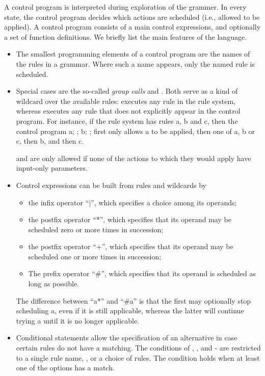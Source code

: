 A control program is interpreted during exploration of the grammer. In every
state, the control program decides which actions are scheduled (i.e., allowed
to be applied). A control program consists of a main control expressions, and
optionally a set of function definitions. We briefly list the main features of
the language.
%
\begin{itemize}
\item The smallest programming elements of a control program are the names of
  the rules in a grammar. Where such a name appears, only the named rule is scheduled.

\item Special cases are the so-called \emph{group calls} \anyK{} and
  \otherK. Both serve as a kind of wildcard over the available rules: \anyK{}
  executes any rule in the rule system, whereas \otherK{} executes any rule
  that does not explicitly appear in the control program. For instance, if the
  rule system has rules \textsf{a}, \textsf{b} and \textsf{c}, then the
  control program \textsf{a; \anyK; b; \otherK;} first only allows \textsf{a}
  to be applied, then one of \textsf{a}, \textsf{b} or \textsf{c}, then
  \textsf{b}, and then \textsf{c}.

  \anyK and \otherK are only allowed if none of the actions to which they
  would apply have input-only parameters.

\item Control expressions can be built from rules and wildcards by 
\begin{itemize}\noitemsep
\item the infix operator ``\textsf{$|$}'', which specifies a choice among its
  operands;
\item the postfix operator ``\textsf{*}'', which specifies that its operand may
  be scheduled zero or more times in succession;
\item the postfix operator ``\textsf{+}'', which specifies that its operand may
  be scheduled one or more times in succession;
\item The prefix operator ``\textsf{\#}'', which specifies that its operand is
  scheduled as long as possible. 
\end{itemize}
The difference between ``\textsf{a*}'' and ``\textsf{\#a}'' is that the first
may optionally stop scheduling \textsf{a}, even if it is still applicable,
whereas the latter will continue trying \textsf{a} until it is no longer applicable.

\item Conditional statements allow the specification of an alternative in case
  certain rules do not have a matching. The conditions of \ifK,
  \whileK, \untilK{} and \doK-\whileK{} are restricted to a
  single rule name, \trueK, or a choice of rules. The condition holds
  when at least one of the options has a match.


\end{itemize}
